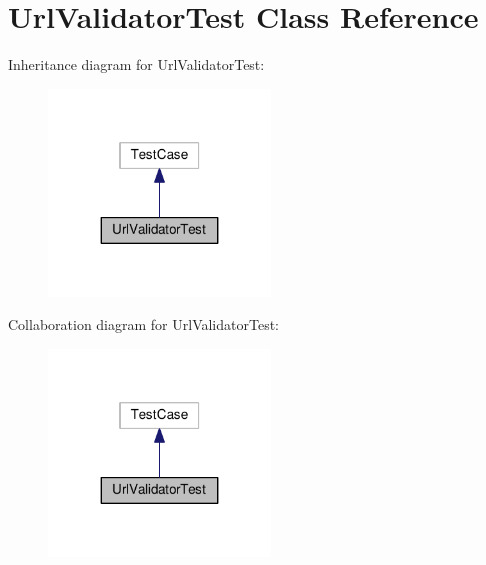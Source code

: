 \hypertarget{classUrlValidatorTest}{}\section{Url\+Validator\+Test Class Reference}
\label{classUrlValidatorTest}


Inheritance diagram for Url\+Validator\+Test\+:
\nopagebreak
\begin{figure}[H]
\begin{center}
\leavevmode
\includegraphics[width=167pt]{classUrlValidatorTest__inherit__graph}
\end{center}
\end{figure}


Collaboration diagram for Url\+Validator\+Test\+:
\nopagebreak
\begin{figure}[H]
\begin{center}
\leavevmode
\includegraphics[width=167pt]{classUrlValidatorTest__coll__graph}
\end{center}
\end{figure}
